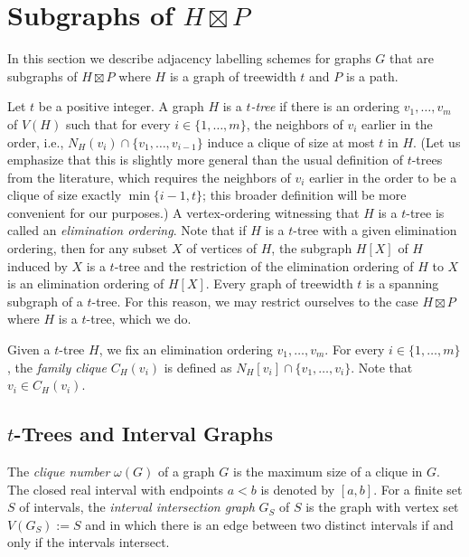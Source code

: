 \documentclass[kpfonts]{patmorin}
\begin{document}

\section{Subgraphs of $H\boxtimes P$}

In this section we describe adjacency labelling schemes for graphs $G$ that are subgraphs of $H\boxtimes P$ where $H$ is a graph of treewidth $t$ and $P$ is a path.


Let $t$ be a positive integer.
A graph $H$ is a \emph{$t$-tree} if there is an ordering $v_1,\dots,v_m$ of $V(H)$ such that 
for every $i\in\{1,\dots,m\}$, the neighbors of $v_i$ earlier in the order, i.e., $N_H(v_i) \cap \{v_1,\dots,v_{i-1}\}$ induce a clique of size at most $t$ in $H$. 
(Let us emphasize that this is slightly more general than the usual definition of $t$-trees from the literature, which requires the neighbors of $v_i$ earlier in the order to be a clique of size exactly $\min\{i-1, t\}$; this broader definition will be more convenient for our purposes.) 
A vertex-ordering witnessing that $H$ is a $t$-tree is called an \emph{elimination ordering}. Note that if $H$ is a $t$-tree with a given elimination ordering, then for any subset $X$ of vertices of $H$, the subgraph $H[X]$ of $H$ induced by $X$ is a $t$-tree and the restriction of the elimination ordering of $H$ to $X$ is an elimination ordering of  $H[X]$.
Every graph of treewidth $t$ is a spanning subgraph of a $t$-tree. 
For this reason, we may restrict ourselves to the case $H\boxtimes P$ where $H$ is a $t$-tree, which we do.


Given a $t$-tree $H$, we fix an elimination ordering $v_1,\dots,v_m$.
For every $i\in\{1,\dots,m\}$, the \emph{family clique} $C_H(v_i)$ is defined as
$N_H[v_i]\cap \{v_1,\dots,v_{i}\}$. 
Note that $v_i \in C_H(v_i)$.

\subsection{$t$-Trees and Interval Graphs}

The \emph{clique number} $\omega(G)$ of a graph $G$ is the maximum size of a clique in $G$. The closed real interval with endpoints $a<b$ is denoted by $[a,b]$.
For a finite set $S$ of intervals, 
the \emph{interval intersection graph} $G_S$ of $S$ is the graph 
with vertex set $V(G_S):=S$ and in which there is an edge between two distinct intervals 
if and only if the intervals intersect.
\end{document}
